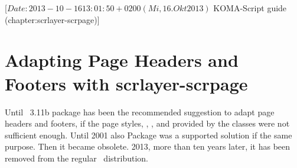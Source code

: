 %
%
%
%
%
%
%
%
% 
%
%
%
%

%
                 [$Date: 2013-10-16 13:01:50 +0200 (Mi, 16. Okt 2013) $
                  KOMA-Script guide (chapter:scrlayer-scrpage)]

\chapter[{Adapting Page Headers and Footers with scrlayer-scrpage}]
  {Adapting Page Headers and
  Footers with scrlayer-scrpage}
%
%

Until \KOMAScript~3.11b package  has been the recommended
suggestion to adapt page headers and footers, if the page
styles, , , and
 provided by the \KOMAScript{} classes were not sufficient
enough. Until 2001 also Package  was a supported solution if
the same purpose. Then it became obsolete. 2013, more than ten years later, it
has been removed from the regular \KOMAScript~distribution.

